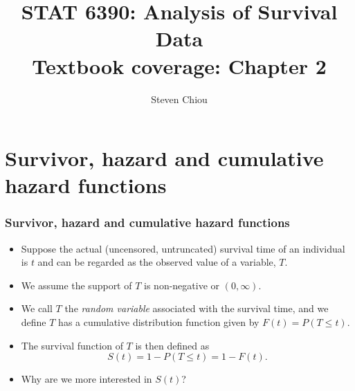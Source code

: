 \documentclass[10pt]{beamer}\usepackage[]{graphicx}\usepackage[]{color}
\title[STAT 6390]{STAT 6390: Analysis of Survival Data\\
  \small{Textbook coverage: Chapter 2}\\}
\author[Steven Chiou]{Steven Chiou}
\institute[UTD]{Department of Mathematical Sciences, \\ University of Texas at Dallas}
\date{}
\begin{document}
\begin{frame}[fragile]
  \titlepage

\end{frame}

\bgroup
{}

\section{Survivor, hazard and cumulative hazard functions}
\begin{frame}
  \frametitle{Survivor, hazard and cumulative hazard functions}
  \begin{itemize}
  \item Suppose the actual (uncensored, untruncated) survival time of an individual is $t$
    and can be regarded as the observed value of a variable, $T$.
  \item We assume the support of $T$ is non-negative or $(0, \infty)$.
  \item We call $T$ the \emph{random variable} associated with the survival time, 
    and we define $T$ has a cumulative distribution function given by
    $F(t) = P(T \le t)$.
  \item The survival function of $T$ is then defined as $$S(t) = 1 - P(T\le t) = 1 - F(t).$$
  \item Why are we more interested in $S(t)$?
  \end{itemize}
\end{frame}
\end{document}
